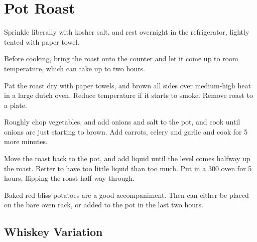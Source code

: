 \section{Pot Roast}
\begin{recipe}


Sprinkle liberally with kosher salt, and rest overnight in the refrigerator, lightly tented with paper towel.

Before cooking, bring the roast onto the counter and let it come up to room temperature, which can take up to two hours.

Pat the roast dry with paper towels, and brown all sides over medium-high heat in a large dutch oven. Reduce temperature if it starts to smoke. Remove roast to a plate.


Roughly chop vegetables, and add onions and salt to the pot, and cook until onions are just starting to brown. Add carrots, celery and garlic and cook for 5 more minutes.


Move the roast back to the pot, and add liquid until the level comes halfway up the roast. Better to have too little liquid than too much. Put in a 300\degree{} oven for 5 hours, flipping the roast half way through.


Baked red bliss potatoes are a good accompaniment. Then can either be placed on the bare oven rack, or added to the pot in the last two hours.

\subsection{Whiskey Variation}

\end{recipe}
